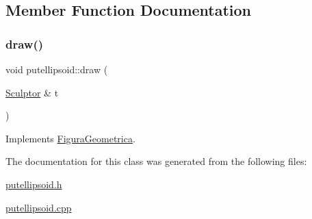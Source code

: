 \subsection{Member Function Documentation}
\mbox{\label{classputellipsoid_a716adca21bdfef33cf3a44b89361a29a}} 
\subsubsection{\texorpdfstring{draw()}{draw()}}
{\footnotesize\ttfamily void putellipsoid\+::draw (\begin{DoxyParamCaption}\item[{\mbox{\hyperlink{class_sculptor}{Sculptor}} \&}]{t }\end{DoxyParamCaption})\hspace{0.3cm}{\ttfamily [virtual]}}



Implements \mbox{\hyperlink{class_figura_geometrica_a34585fd7c0bd7378fc69c4ee208e676c}{Figura\+Geometrica}}.



The documentation for this class was generated from the following files\+:\begin{DoxyCompactItemize}
\item 
\mbox{\hyperlink{putellipsoid_8h}{putellipsoid.\+h}}\item 
\mbox{\hyperlink{putellipsoid_8cpp}{putellipsoid.\+cpp}}\end{DoxyCompactItemize}
